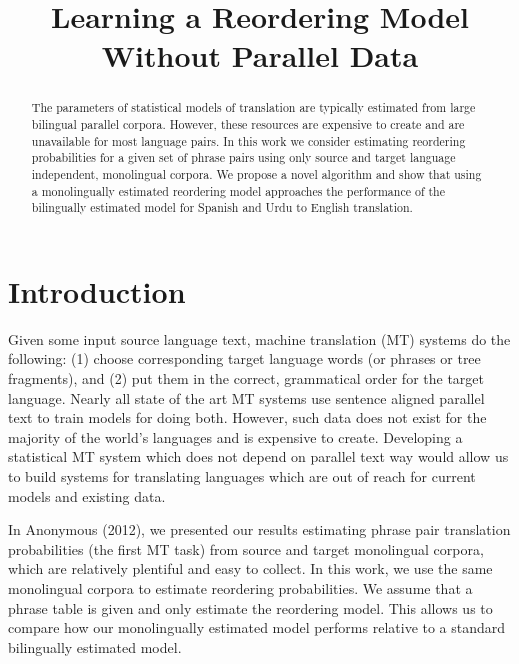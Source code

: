 \documentclass[11pt,letterpaper]{article}
\title{Learning a Reordering Model Without Parallel Data}
\date{}
\begin{document}
\maketitle

\begin{abstract}
The parameters of statistical models of translation are typically estimated from large bilingual parallel corpora.  However, these resources are expensive to create and are unavailable for most language pairs.  In this work we consider estimating reordering probabilities for a given set of phrase pairs using only source and target language independent, monolingual corpora. We propose a novel algorithm and show that using a monolingually estimated reordering model approaches the performance of the bilingually estimated model for Spanish and Urdu to English translation.
\end{abstract}

\section{Introduction}

Given some input source language text, machine translation (MT) systems do the following: (1) choose corresponding target language words (or phrases or tree fragments), and (2) put them in the correct, grammatical order for the target language. Nearly all state of the art MT systems use sentence aligned parallel text to train models for doing both. However, such data does not exist for the majority of the world's languages and is expensive to create. Developing a statistical MT system which does not depend on parallel text way would allow us to build systems for translating languages which are out of reach for current models and existing data. 

In Anonymous (2012), we presented our results estimating phrase pair translation probabilities (the first MT task) from source and target monolingual corpora, which are relatively plentiful and easy to collect. In this work, we use the same monolingual corpora to estimate reordering probabilities. We assume that a phrase table is given and only estimate the reordering model. This allows us to compare how our monolingually estimated model performs relative to a standard bilingually estimated model.

\end{document}
